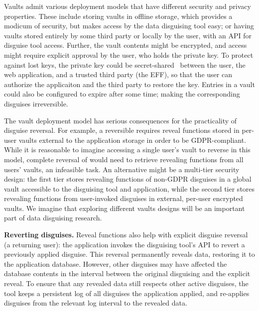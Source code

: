 %
Vaults admit various deployment models that have different security and privacy
properties.
%
%
These include storing vaults in offline storage, which provides a modicum of security,
but makes access by the data disguising tool easy; or having vaults stored entirely by
some third party or locally by the user, with an API for disguise tool access.
%
Further, the vault contents might be encrypted, and access might require explicit approval
by the user, who holds the private key.
%
To protect against lost keys, the private key could be secret-shared~\cite{secretsharing}
between the user, the web application, and a trusted third party (\eg the EFF), so that
the user can authorize the applicaiton and the third party to restore the key.
%
Entries in a vault could also be configured to expire after some time; making the
corresponding disguises irreversible.
%

%
The vault deployment model has serious consequences for the practicality of disguise
reversal.
%
For example, a reversible \gdpr requires reveal functions stored in per-user vaults
external to the application storage in order to be GDPR-compliant.
%
While it is reasonable to imagine accessing a single user's vault to reverse \gdpr in
this model, complete reversal of \ca would need to retrieve revealing functions from
all users' vaults, an infeasible task.
%
An alternative might be a multi-tier security design: the first tier stores revealing
functions of non-GDPR disguises in a global vault accessible to the disguising tool
and application, while the second tier stores revealing functions from user-invoked
disguises in external, per-user encrypted vaults.
%
We imagine that exploring different vaults designs will be an important part of
data disguising research.
%

\textbf{Reverting disguises.}
%
Reveal functions also help with explicit disguise reversal (\eg a returning user): the
application invokes the disguising tool's API to revert a previously applied disguise.
%
This reversal permanently reveals data, restoring it to the application database.
%
However, other disguises may have affected the database contents in the interval between
the original disguising and the explicit reveal.
%
To ensure that any revealed data still respects other active disguises, the tool keeps
a persistent log of all disguises the application applied, and re-applies disguises from
the relevant log interval to the revealed data.
%

